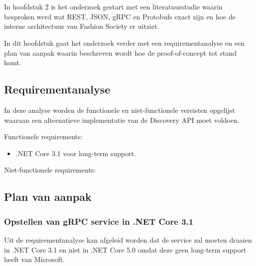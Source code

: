
\chapter{}
\label{ch:methodologie}


In hoofdstuk 2 is het onderzoek gestart met een literatuurstudie waarin besproken werd wat REST, JSON, gRPC en Protobufs exact zijn en hoe de interne architectuur van Fashion Society er uitziet.

In dit hoofdstuk gaat het onderzoek verder met een requirementanalyse en een plan van aanpak waarin beschreven wordt hoe de proof-of-concept tot stand komt.



\section{Requirementanalyse}
\label{sec:Requirementanalyse}

In deze analyse worden de functionele en niet-functionele vereisten opgelijst waaraan een alternatieve implementatie van de Discovery API moet voldoen.

Functionele requirements:
\begin{itemize}
    \item .NET Core 3.1 voor long-term support.
\end{itemize}

Niet-functionele requirements:


\section{Plan van aanpak}
\label{sec:Plan van aanpak}

\subsection{Opstellen van gRPC service in .NET Core 3.1 }
\label{subsec:Opstellen van gRPC service in .NET Core 3.1}
Uit de requirementanalyse kan afgeleid worden dat de service zal moeten draaien in .NET Core 3.1 en niet in .NET Core 5.0 omdat deze geen long-term support heeft van Microsoft.

